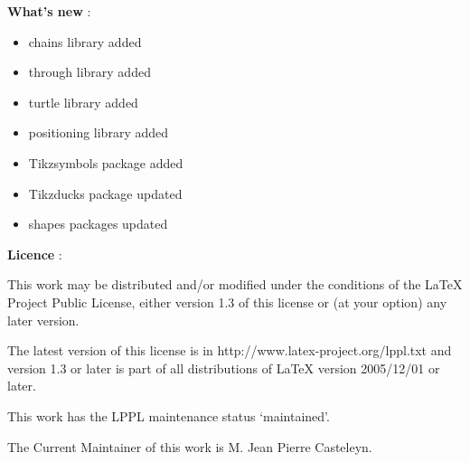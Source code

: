 \vspace{1cm}
{
\textbf{What's new } :
\begin{itemize}
\item chains library added \pageref{lib-chains}
\item through library added \pageref{lib-through}
\item turtle library added \pageref{lib-turtle}
\item positioning library added \pageref{lib-pos}
\item Tikzsymbols package added \pageref{symbol}
\item Tikzducks package updated \pageref{ducks}
\item shapes packages updated \pageref{formes}
\end{itemize}
}



\vspace{1cm}
\textbf{Licence } :


This work may be distributed and/or modified under the conditions of the LaTeX Project Public License, either version 1.3 of this license or (at your option) any later version.

 The latest version of this license is in  http://www.latex-project.org/lppl.txt and version 1.3 or later is part of all distributions of LaTeX
version 2005/12/01 or later.

This work has the LPPL maintenance status `maintained'.

The Current Maintainer of this work is M. Jean Pierre Casteleyn.

\vspace{2cm}

 
\newpage